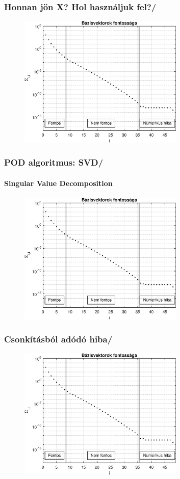 \documentclass[aspectratio=43]{beamer}
\newcommand{\numframetitle}[1]{\frametitle{#1\hfill\insertframenumber/\insertpresentationendpage\hspace{-\fill}}}
\begin{document}
\begin{frame}
	\numframetitle{Honnan jön \textbf{X}? Hol használjuk fel?}
    	\begin{figure}
			\includegraphics[width=0.7\textwidth]{kep/euler_0.15_4_sv.eps}
		\end{figure}
\end{frame}
\begin{frame}
	\numframetitle{POD algoritmus: SVD}
    \framesubtitle{Singular Value Decomposition}
    	\begin{figure}
			\includegraphics[width=0.7\textwidth]{kep/euler_0.15_4_sv.eps}
		\end{figure}
\end{frame}
\begin{frame}
	\numframetitle{Csonkításból adódó hiba}
    	\begin{figure}
			\includegraphics[width=0.7\textwidth]{kep/euler_0.15_4_sv.eps}
		\end{figure}
\end{frame}
\end{document}
